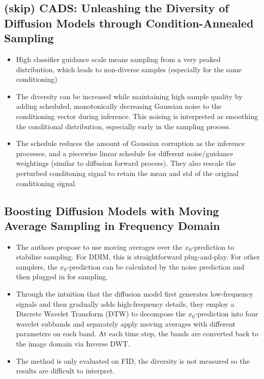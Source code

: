 \documentclass{article}
\begin{document}
\subsection{(skip) CADS: Unleashing the Diversity of Diffusion
Models through Condition-Annealed Sampling}
\begin{itemize}
    \item High classifier guidance scale means sampling from a very peaked distribution, which leads to non-diverse samples (especially for the same conditioning)
    \item The diversity can be increased while maintaining high sample quality by adding scheduled, monotonically decreasing Gaussian noise to the conditioning vector during inference. This noising is interpreted as smoothing the conditional distribution, especially early in the sampling process.
    \item The schedule reduces the amount of Gaussian corruption as the inference processes, and a piecewise linear schedule for different noise/guidance weightings (similar to diffusion forward process). They also rescale the perturbed conditoning signal to retain the mean and std of the original conditioning signal.
\end{itemize}

\subsection{Boosting Diffusion Models with Moving Average Sampling in Frequency Domain}


\begin{itemize}
    \item The authors propose to use moving averages over the $x_0$-prediction to stabilize sampling. For DDIM, this is straightforward plug-and-play. For other samplers, the $x_0$-prediction can be calculated by the noise prediction and then plugged in for sampling.
    \item Through the intuition that the diffusion model first generates low-frequency signals and then gradually adds high-frequency details, they employ a Discrete Wavelet Transform (DTW) to decompose the $x_0$-prediction into four wavelet subbands and separately apply moving averages with different parameters on each band. At each time step, the bands are converted back to the image domain via Inverse DWT.
    \item The method is only evaluated on FID, the diversity is not measured so the results are difficult to interpret.
\end{itemize}
\end{document}
